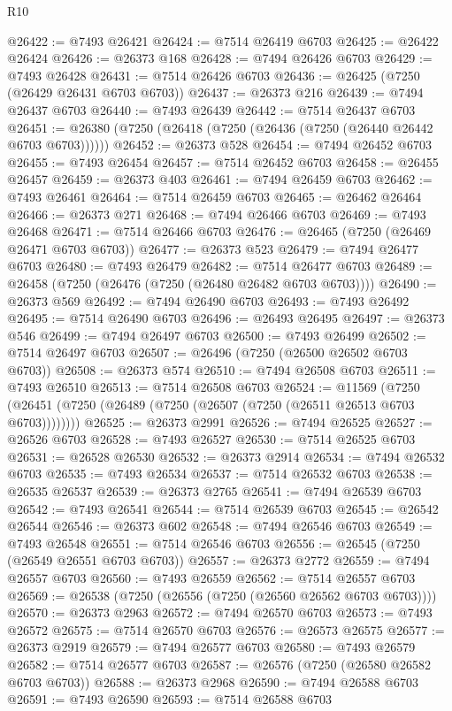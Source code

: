 \begin{lexlean}{R10}
\begin{coremodule}
{{{{{{{{{{{{{{{{{{{{{{{{{{{{{{{{{{{{{{{{{{{{{{{{{{{{{{{{{{{{{{{{{{{{{{{{{{{{{{{{{{{{@26422 := @7493 @26421
@26424 := @7514 @26419 @6703
@26425 := @26422 @26424
@26426 := @26373 @168
@26428 := @7494 @26426 @6703
@26429 := @7493 @26428
@26431 := @7514 @26426 @6703
@26436 := @26425 (@7250 (@26429 @26431 @6703 @6703))
@26437 := @26373 @216
@26439 := @7494 @26437 @6703
@26440 := @7493 @26439
@26442 := @7514 @26437 @6703
@26451 := @26380 (@7250 (@26418 (@7250 (@26436 (@7250 (@26440 @26442 @6703 @6703))))))
@26452 := @26373 @528
@26454 := @7494 @26452 @6703
@26455 := @7493 @26454
@26457 := @7514 @26452 @6703
@26458 := @26455 @26457
@26459 := @26373 @403
@26461 := @7494 @26459 @6703
@26462 := @7493 @26461
@26464 := @7514 @26459 @6703
@26465 := @26462 @26464
@26466 := @26373 @271
@26468 := @7494 @26466 @6703
@26469 := @7493 @26468
@26471 := @7514 @26466 @6703
@26476 := @26465 (@7250 (@26469 @26471 @6703 @6703))
@26477 := @26373 @523
@26479 := @7494 @26477 @6703
@26480 := @7493 @26479
@26482 := @7514 @26477 @6703
@26489 := @26458 (@7250 (@26476 (@7250 (@26480 @26482 @6703 @6703))))
@26490 := @26373 @569
@26492 := @7494 @26490 @6703
@26493 := @7493 @26492
@26495 := @7514 @26490 @6703
@26496 := @26493 @26495
@26497 := @26373 @546
@26499 := @7494 @26497 @6703
@26500 := @7493 @26499
@26502 := @7514 @26497 @6703
@26507 := @26496 (@7250 (@26500 @26502 @6703 @6703))
@26508 := @26373 @574
@26510 := @7494 @26508 @6703
@26511 := @7493 @26510
@26513 := @7514 @26508 @6703
@26524 := @11569
    (@7250 (@26451 (@7250 (@26489 (@7250 (@26507 (@7250 (@26511 @26513 @6703 @6703))))))))
@26525 := @26373 @2991
@26526 := @7494 @26525
@26527 := @26526 @6703
@26528 := @7493 @26527
@26530 := @7514 @26525 @6703
@26531 := @26528 @26530
@26532 := @26373 @2914
@26534 := @7494 @26532 @6703
@26535 := @7493 @26534
@26537 := @7514 @26532 @6703
@26538 := @26535 @26537
@26539 := @26373 @2765
@26541 := @7494 @26539 @6703
@26542 := @7493 @26541
@26544 := @7514 @26539 @6703
@26545 := @26542 @26544
@26546 := @26373 @602
@26548 := @7494 @26546 @6703
@26549 := @7493 @26548
@26551 := @7514 @26546 @6703
@26556 := @26545 (@7250 (@26549 @26551 @6703 @6703))
@26557 := @26373 @2772
@26559 := @7494 @26557 @6703
@26560 := @7493 @26559
@26562 := @7514 @26557 @6703
@26569 := @26538 (@7250 (@26556 (@7250 (@26560 @26562 @6703 @6703))))
@26570 := @26373 @2963
@26572 := @7494 @26570 @6703
@26573 := @7493 @26572
@26575 := @7514 @26570 @6703
@26576 := @26573 @26575
@26577 := @26373 @2919
@26579 := @7494 @26577 @6703
@26580 := @7493 @26579
@26582 := @7514 @26577 @6703
@26587 := @26576 (@7250 (@26580 @26582 @6703 @6703))
@26588 := @26373 @2968
@26590 := @7494 @26588 @6703
@26591 := @7493 @26590
@26593 := @7514 @26588 @6703
}}}}}}}}}}}}}}}}}}}}}}}}}}}}}}}}}}}}}}}}}}}}}}}}}}}}}}}}}}}}}}}}}}}}}}}}}}}}}}}}}}}}
\end{coremodule}
\end{lexlean}
